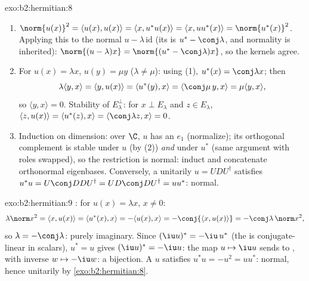 \begin{solution}{exo:b2:hermitian:8}
\begin{enumerate}
  \item $\norm{u(x)}^2 = \langle u(x), u(x)\rangle = \langle x,
        u^*u(x)\rangle = \langle x, uu^*(x)\rangle =
        \norm{u^*(x)}^2$. Applying this to the normal $u -
        \lambda\,\mathrm{id}$ (its  is $u^* -
        \conj\lambda$, and normality is inherited): $\norm{(u -
        \lambda)x} = \norm{(u^* - \conj\lambda)x}$, so the kernels
        agree.
  \item For  $u(x) = \lambda x$, $u(y) = \mu y$
        ($\lambda \neq \mu$): using (1), $u^*(x) = \conj\lambda x$;
        then
        \[
        \lambda\langle y, x\rangle = \langle y, u(x)\rangle
        = \langle u^*(y), x\rangle = \langle \conj\mu\, y, x\rangle
        = \mu \langle y, x\rangle ,
        \]
        so $\langle y, x\rangle = 0$. Stability of $E_\lambda^\perp$:
        for $x \perp E_\lambda$ and $z \in E_\lambda$, $\langle z,
        u(x)\rangle = \langle u^*(z), x\rangle =
        \langle\conj\lambda z, x\rangle = 0$.
  \item Induction on dimension: over $\C$, $u$ has an 
        $e_1$ (normalize); its orthogonal complement is stable
        under $u$ (by (2)) \emph{and} under $u^*$ (same argument
        with roles swapped), so the restriction is normal: induct
        and concatenate orthonormal eigenbases. Conversely, a
        unitarily  $u = UDU^\dagger$ satisfies $u^*u
        = U\conj D D U^\dagger = U D\conj D U^\dagger = uu^*$:
        normal.
\end{enumerate}
\end{solution}

\begin{solution}{exo:b2:hermitian:9}
: for $u(x) = \lambda x$, $x \neq 0$:
\[
\lambda\norm x^2 = \langle x, u(x)\rangle
= \langle u^*(x), x\rangle = -\langle u(x), x\rangle
= -\conj{\langle x, u(x)\rangle} = -\conj\lambda\,\norm x^2 ,
\]
so $\lambda = -\conj\lambda$: purely imaginary. Since $(\iu
u)^* = -\iu\,u^*$ (the  is conjugate-linear in scalars),
$u^* = u$ gives $(\iu u)^* = -\iu u$: the map $u \mapsto \iu u$
sends  to , with inverse $w \mapsto -\iu
w$: a bijection. A  $u$ satisfies $u^*u = -u^2 =
uu^*$: normal, hence unitarily  by
\cref{exo:b2:hermitian:8}.
\end{solution}

